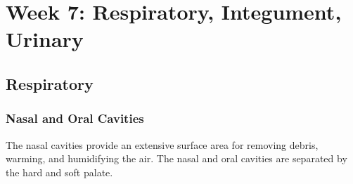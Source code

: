 \chapter{Week 7: Respiratory, Integument, Urinary}

\section{Respiratory}

\begin{center}
\end{center}


\subsection{Nasal and Oral Cavities}
The nasal cavities provide an extensive surface area for removing debris, warming, and humidifying the air. The nasal and oral cavities are separated by the hard and soft palate.
